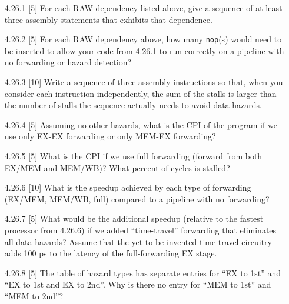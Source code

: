 \begin{enumerate}
  \item[4.26.1] [5] For each RAW dependency listed above, give a sequence of
        at least three assembly statements that exhibits that dependence.
  \item[4.26.2] [5] For each RAW dependency above, how many \texttt{nop}(s)
        would need to be inserted to allow your code from 4.26.1 to run
        correctly on a pipeline with no forwarding or hazard detection?
  \item[4.26.3] [10] Write a sequence of three assembly instructions so that,
        when you consider each instruction independently, the sum of the
        stalls is larger than the number of stalls the sequence actually
        needs to avoid data hazards.
  \item[4.26.4] [5] Assuming no other hazards, what is the CPI of the
        program if we use only EX-EX forwarding or only MEM-EX forwarding?
  \item[4.26.5] [5] What is the CPI if we use full forwarding (forward from
        both EX/MEM and MEM/WB)? What percent of cycles is stalled?
  \item[4.26.6] [10] What is the speedup achieved by each type of forwarding
        (EX/MEM, MEM/WB, full) compared to a pipeline with no forwarding?
  \item[4.26.7] [5] What would be the additional speedup (relative to the
        fastest processor from 4.26.6) if we added ``time-travel''
        forwarding that eliminates all data hazards? Assume that the
        yet-to-be-invented time-travel circuitry adds 100 ps to the latency
        of the full-forwarding EX stage.
  \item[4.26.8] [5] The table of hazard types has separate entries for ``EX
        to 1st'' and ``EX to 1st and EX to 2nd''. Why is there no entry for
        ``MEM to 1st'' and ``MEM to 2nd''?
\end{enumerate}

\problembreak

